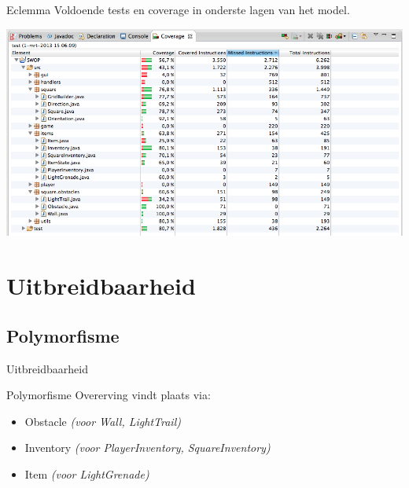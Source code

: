 \documentclass[t]{beamer}
\begin{document}
\begin{frame}[plain]{Eclemma}
Voldoende tests en coverage in onderste lagen van het model.
\begin{center}
\includegraphics[width= 1\linewidth]{images/coverage.png}
\end{center}
\end{frame}


\section{Uitbreidbaarheid}
\subsection{Polymorfisme}
\begin{frame}{Uitbreidbaarheid}
\begin{multicols}{2}
\tableofcontents[currentsection]
\end{multicols}
\end{frame}

\begin{frame}{Polymorfisme}
Overerving vindt plaats via:
\begin{itemize}
	\item Obstacle \textit{(voor Wall, LightTrail)}
	\item Inventory \textit{(voor PlayerInventory, SquareInventory)}
	\item Item	\textit{(voor LightGrenade)}
\end{itemize}
\end{frame}
\end{document}
